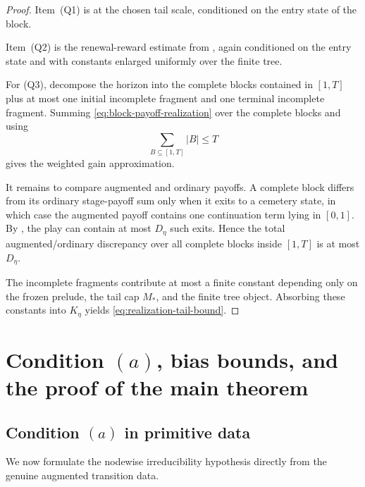 \documentclass[12pt]{article}
\theoremstyle{definition}
\newcommand{\1}{\mathbf{1}}
\begin{document}
\begin{proof}
Item~(Q1) is  at the chosen tail scale, conditioned on
the entry state of the block.

Item~(Q2) is the renewal-reward estimate from , again
conditioned on the entry state and with constants enlarged uniformly over the
finite tree.

For (Q3), decompose the horizon into the complete blocks contained in $[1,T]$ plus
at most one initial incomplete fragment and one terminal incomplete fragment.
Summing \eqref{eq:block-payoff-realization} over the complete blocks and using
\[
\sum_{B\subseteq [1,T]} |B|\le T
\]
gives the weighted gain approximation.

It remains to compare augmented and ordinary payoffs. A complete block differs
from its ordinary stage-payoff sum only when it exits to a cemetery state, in
which case the augmented payoff contains one continuation term lying in $[0,1]$.
By , the play can contain at most $D_\eta$ such exits.
Hence the total augmented/ordinary discrepancy over all complete blocks inside
$[1,T]$ is at most $D_\eta$.

The incomplete fragments contribute at most a finite constant depending only on the
frozen prelude, the tail cap $M_*$, and the finite tree object. Absorbing these
constants into $K_\eta$ yields \eqref{eq:realization-tail-bound}.
\end{proof}

\section{Condition \texorpdfstring{$(a)$}{(a)}, bias bounds, and the proof of the main theorem}
\label{sec:proof-main}

\subsection{Condition \texorpdfstring{$(a)$}{(a)} in primitive data}

We now formulate the nodewise irreducibility hypothesis directly from the genuine
augmented transition data.
\end{document}
